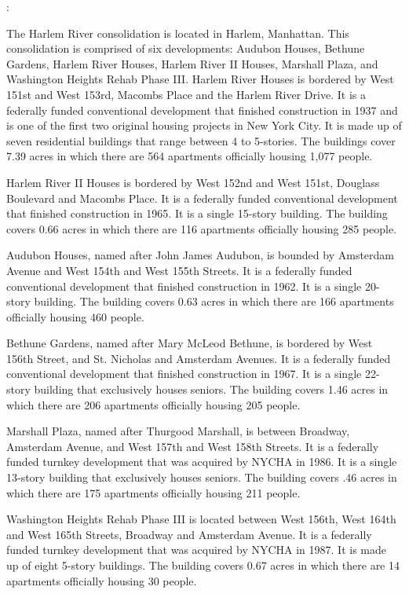 :

The Harlem River consolidation is located in Harlem, Manhattan. This consolidation is comprised of six developments: Audubon Houses, Bethune Gardens, Harlem River Houses, Harlem River II Houses, Marshall Plaza, and Washington Heights Rehab Phase III. Harlem River Houses is bordered by West 151st and West 153rd, Macombs Place and the Harlem River Drive. It is a federally funded conventional development that finished construction in 1937 and is one of the first two original housing projects in New York City. It is made up of seven residential buildings that range between 4 to 5-stories. The buildings cover 7.39 acres in which there are 564 apartments officially housing 1,077 people. 

Harlem River II Houses is bordered by West 152nd and West 151st, Douglass Boulevard and Macombs Place. It is a federally funded conventional development that finished construction in 1965. It is a single 15-story building. The building covers 0.66 acres in which there are 116 apartments officially housing 285 people. 

Audubon Houses, named after John James Audubon, is bounded by Amsterdam Avenue and West 154th and West 155th Streets. It is a federally funded conventional development that finished construction in 1962. It is a single 20-story building. The building covers 0.63 acres in which there are 166 apartments officially housing 460 people. 

Bethune Gardens, named after Mary McLeod Bethune, is bordered by West 156th Street, and St. Nicholas and Amsterdam Avenues. It is a federally funded conventional development that finished construction in 1967. It is a single 22-story building that exclusively houses seniors. The building covers 1.46 acres in which there are 206 apartments officially housing 205 people.

Marshall Plaza, named after Thurgood Marshall, is between Broadway, Amsterdam Avenue, and West 157th and West 158th Streets. It is a federally funded turnkey development that was acquired by NYCHA in 1986. It is a single 13-story building that exclusively houses seniors. The building covers .46 acres in which there are 175 apartments officially housing 211 people.

Washington Heights Rehab Phase III is located between West 156th, West 164th and West 165th Streets, Broadway and Amsterdam Avenue. It is a federally funded turnkey development that was acquired by NYCHA in 1987. It is made up of eight 5-story buildings. The building covers 0.67 acres in which there are 14 apartments officially housing 30 people. 